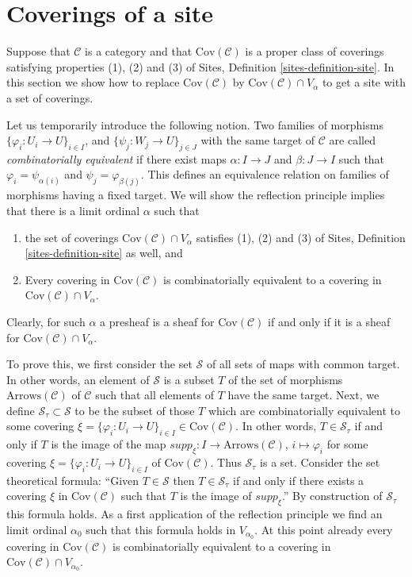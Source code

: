 \section{Coverings of a site}
\label{section-coverings-site}

\noindent
Suppose that $\mathcal{C}$ is a category and
that $\text{Cov}(\mathcal{C})$ is a proper class of coverings
satisfying properties (1), (2) and (3) of Sites,
Definition \ref{sites-definition-site}.
In this section we show how to replace $\text{Cov}(\mathcal{C})$
by $\text{Cov}(\mathcal{C}) \cap V_\alpha$ to get a site
with a set of coverings.

\medskip\noindent
Let us temporarily introduce the following notion.
Two families of morphisms $\{\varphi_i : U_i \to U\}_{i\in I}$, and
$\{\psi_j : W_j \to U\}_{j\in J}$ with the same target of $\mathcal{C}$ are
called {\it combinatorially equivalent} if there exist maps
$\alpha : I \to J$ and $\beta : J\to I$ such that
$\varphi_i = \psi_{\alpha(i)}$ and $\psi_j = \varphi_{\beta(j)}$.
This defines an equivalence relation on families of morphisms
having a fixed target.
We will show the reflection principle implies that there is a limit ordinal
$\alpha$ such that
\begin{enumerate}
\item the set of coverings
$\text{Cov}(\mathcal{C}) \cap V_\alpha$ satisfies
(1), (2) and (3) of Sites, Definition \ref{sites-definition-site}
as well, and
\item Every covering in $\text{Cov}(\mathcal{C})$
is combinatorially equivalent
to a covering in $\text{Cov}(\mathcal{C}) \cap V_\alpha$.
\end{enumerate}
Clearly, for such $\alpha$ a presheaf is a sheaf for $\text{Cov}(\mathcal{C})$
if and only if it is a sheaf for $\text{Cov}(\mathcal{C}) \cap V_\alpha$.

\medskip\noindent
To prove this, we first consider the set $\mathcal{S}$ of all sets of maps
with common target. In other words, an element of
$\mathcal{S}$ is a subset $T$ of the set of morphisms 
$\text{Arrows}(\mathcal{C})$ of $\mathcal{C}$ such that all
elements of $T$ have the same target. Next, we define
$\mathcal{S}_\tau \subset \mathcal{S}$ to be the subset of those
$T$ which are combinatorially equivalent to some covering
$\xi = \{\varphi_i : U_i \to U\}_{i\in I} \in \text{Cov}(\mathcal{C})$.
In other words, $T \in \mathcal{S}_\tau$ if and only if $T$
is the image of the map $supp_\xi : I \to \text{Arrows}(\mathcal{C})$,
$i\mapsto \varphi_i$ for some covering
$\xi = \{\varphi_i : U_i \to U\}_{i\in I}$
of $\text{Cov}(\mathcal{C})$. Thus $\mathcal{S}_\tau$
is a set. Consider the set theoretical formula: ``Given $T \in \mathcal{S}$
then $T\in \mathcal{S}_\tau$ if and only if there exists
a covering $\xi$ in $\text{Cov}(\mathcal{C})$ such that
$T$ is the image of $supp_\xi$.'' By construction of $\mathcal{S}_\tau$
this formula holds. As a first application of the
reflection principle we find an limit ordinal $\alpha_0$ such that
this formula holds in $V_{\alpha_0}$. At this point already every
covering in $\text{Cov}(\mathcal{C})$ is combinatorially equivalent
to a covering in $\text{Cov}(\mathcal{C}) \cap V_{\alpha_0}$.

